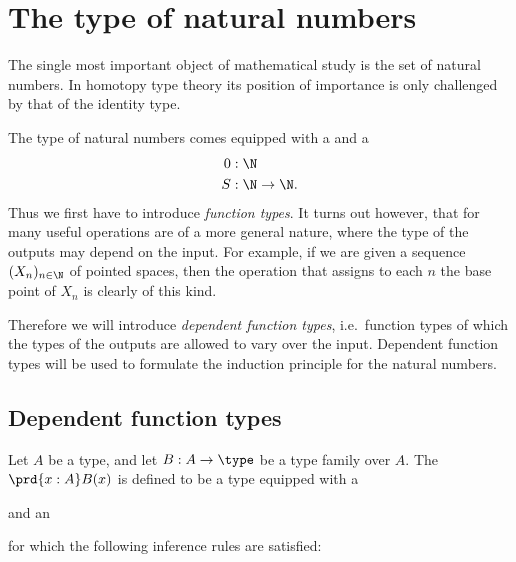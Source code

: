 \chapter{The type of natural numbers}

The single most important object of mathematical study is the set of natural numbers. In homotopy type theory its position of importance is only challenged by that of the identity type.

The type of natural numbers comes equipped with a  and a 
\begin{align*}
0 & : \N \\
S & : \N\to \N.
\end{align*}
Thus we first have to introduce \emph{function types}. 
It turns out however, that for many useful operations are of a more general nature, where the type of the outputs may depend on the input.  
For example, if we are given a sequence $(X_n)_{n\in\N}$ of pointed spaces, then the operation that assigns to each $n$ the base point of $X_n$ is clearly of this kind.

Therefore we will introduce \emph{dependent function types}, i.e.~function types of which the types of the outputs are allowed to vary over the input.
Dependent function types will be used to formulate the induction principle for the natural numbers.

\section{Dependent function types}

\begin{defn}
Let $A$ be a type, and let $B:A\to\type$ be a type family over $A$.
The  $\prd{x:A}B(x)$ is defined to be a type equipped with a 
\begin{prooftree}
\end{prooftree}
and an 
\begin{prooftree}
\end{prooftree}
for which the following inference rules are satisfied:
\begin{prooftree}
\end{prooftree}
\begin{prooftree}
\end{prooftree}
\end{defn}

